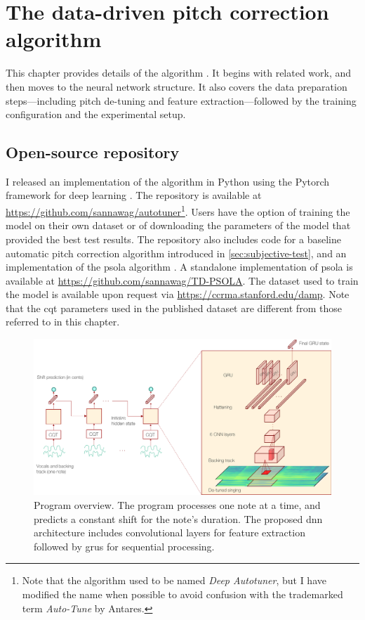 \chapter{The data-driven pitch correction algorithm}
\label{chap:thesis-autotuner}
This chapter provides details of the algorithm \cite{wager2020deep}. It begins with related work, and then moves to the neural network structure. It also covers the data preparation steps---including pitch de-tuning and feature extraction---followed by the training configuration and the experimental setup. 

\section{Open-source repository}
I released an implementation of the algorithm in Python using the Pytorch framework for deep learning \cite{paszke2019pytorch}. The repository is available at \url{https://github.com/sannawag/autotuner}\footnote{Note that the algorithm used to be named \textit{Deep Autotuner}, but I have modified the name when possible to avoid confusion with the trademarked term \textit{Auto-Tune} by Antares.}. Users have the option of training the model on their own dataset or of downloading the parameters of the model that provided the best test results. The repository also includes code for a baseline automatic pitch correction algorithm introduced in \ref{sec:subjective-test}, and an implementation of the \gls{psola} algorithm \cite{charpentier1986diphone}. A standalone implementation of \gls{psola} is available at \url{https://github.com/sannawag/TD-PSOLA}. The dataset used to train the model is available upon request via \url{https://ccrma.stanford.edu/damp}. Note that the \gls{cqt} parameters used in the published dataset are different from those referred to in this chapter.

\begin{figure}[t!]
    \centering
    \includegraphics[width=\columnwidth]{images/model_outline_1.png}
    \caption{Program overview. The program processes one note at a time, and predicts a constant shift for the note's duration. The proposed \gls{dnn} architecture includes convolutional layers for feature extraction followed by \gls{gru}s for sequential processing.}
    \label{fig:model_outline}
\end{figure}

